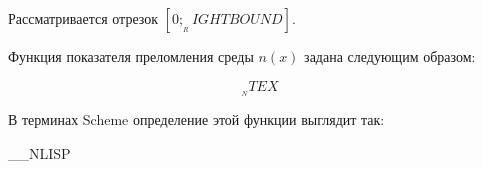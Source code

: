 Рассматривается отрезок $[0; __RIGHTBOUND]$.

Функция показателя преломления среды $n(x)$ задана следующим
образом:

\begin{equation*}
__NTEX
\end{equation*}

В терминах Scheme определение этой функции выглядит так:

__NLISP